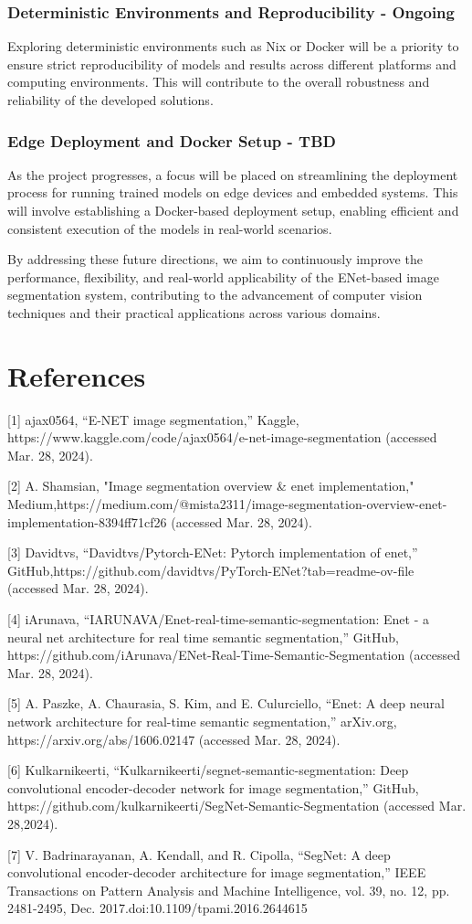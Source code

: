 \subsection{Deterministic Environments and Reproducibility - Ongoing}
Exploring deterministic environments such as Nix or Docker will be a priority to ensure strict reproducibility of models and results across different platforms and computing environments. This will contribute to the overall robustness and reliability of the developed solutions.
\subsection{Edge Deployment and Docker Setup - TBD}
As the project progresses, a focus will be placed on streamlining the deployment process for running trained models on edge devices and embedded systems. This will involve establishing a Docker-based deployment setup, enabling efficient and consistent execution of the models in real-world scenarios.

By addressing these future directions, we aim to continuously improve the performance, flexibility, and real-world applicability of the ENet-based image segmentation system, contributing to the advancement of computer vision techniques and their practical applications across various domains.

\chapter*{References}

 [1] ajax0564, “E-NET image segmentation,” Kaggle, https://www.kaggle.com/code/ajax0564/e-net-image-segmentation (accessed Mar. 28, 2024).

  [2] A. Shamsian, "Image segmentation overview \& enet implementation," Medium,https://medium.com/@mista2311/image-segmentation-overview-enet-implementation-8394ff71cf26 (accessed Mar. 28, 2024).

  [3] Davidtvs, “Davidtvs/Pytorch-ENet: Pytorch implementation of enet,” GitHub,https://github.com/davidtvs/PyTorch-ENet?tab=readme-ov-file (accessed Mar. 28, 2024).

  [4] iArunava, “IARUNAVA/Enet-real-time-semantic-segmentation: Enet - a neural net architecture for real time semantic segmentation,” GitHub, https://github.com/iArunava/ENet-Real-Time-Semantic-Segmentation (accessed Mar. 28, 2024).

  [5] A. Paszke, A. Chaurasia, S. Kim, and E. Culurciello, “Enet: A deep neural network architecture for real-time semantic segmentation,” arXiv.org, https://arxiv.org/abs/1606.02147 (accessed Mar. 28, 2024).

  [6] Kulkarnikeerti, “Kulkarnikeerti/segnet-semantic-segmentation: Deep convolutional encoder-decoder network for image segmentation,” GitHub, https://github.com/kulkarnikeerti/SegNet-Semantic-Segmentation (accessed Mar. 28,2024).

  [7] V. Badrinarayanan, A. Kendall, and R. Cipolla, “SegNet: A deep convolutional encoder-decoder architecture for image segmentation,” IEEE Transactions on Pattern Analysis and Machine Intelligence, vol. 39, no. 12, pp. 2481-2495, Dec. 2017.doi:10.1109/tpami.2016.2644615